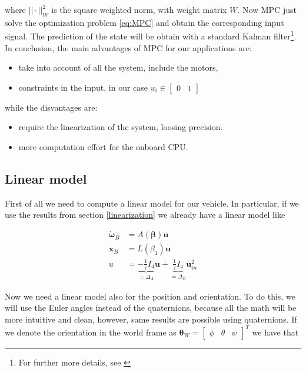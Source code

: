\noindent where $||\cdot||^2_{W}$ is the square weighted norm, with weight matrix $W$. Now MPC just solve the optimization problem \eqref{eq:MPC} and obtain the corresponding input signal. The prediction of the state will be obtain with a standard Kalman filter\footnote{For further more details, see \cite{MPC}}. In conclusion, the main advantages of MPC for our applications are:

\begin{itemize}
	\item take into account of all the system, include the motors,
	\item constraints in the input, in our case $u_{i} \in \begin{bmatrix}0 & 1 \end{bmatrix}$
\end{itemize}

\noindent while the disvantages are:

\begin{itemize}
	\item require the linearization of the system, loosing precision.
	\item more computation effort for the onboard CPU.
\end{itemize}

\subsection{Linear model}

First of all we need to compute a linear model for our vehicle. In particular, if we use the results from section \ref{linearization} we already have a linear model like

\begin{align}
	\dot{\boldsymbol{\omega}}_B &= A(\boldsymbol{\beta})\mathbf{u} \label{eq:MPCdyn1} \\
	\ddot{\mathbf{x}}_B &= L(\beta_1)\mathbf{u} \label{eq:MPCdyn2} \\
	\dot{u} &= \underbrace{-\frac{1}{\tau}I_4}_{=\Delta_A}\mathbf{u} + \underbrace{\frac{1}{\tau}I_4}_{=\Delta_B}\mathbf{u}_{in}^2 \label{eq:MPCdyn3}
\end{align}

\noindent Now we need a linear model also for the position and orientation. To do this, we will use the Euler angles instead of the quaternions, because all the math will be more intuitive and clean, however, same results are possible using quaternions. If we denote the orientation in the world frame as $\boldsymbol{\theta}_W = \begin{bmatrix} \phi & \theta & \psi \end{bmatrix}^T$ we have that

